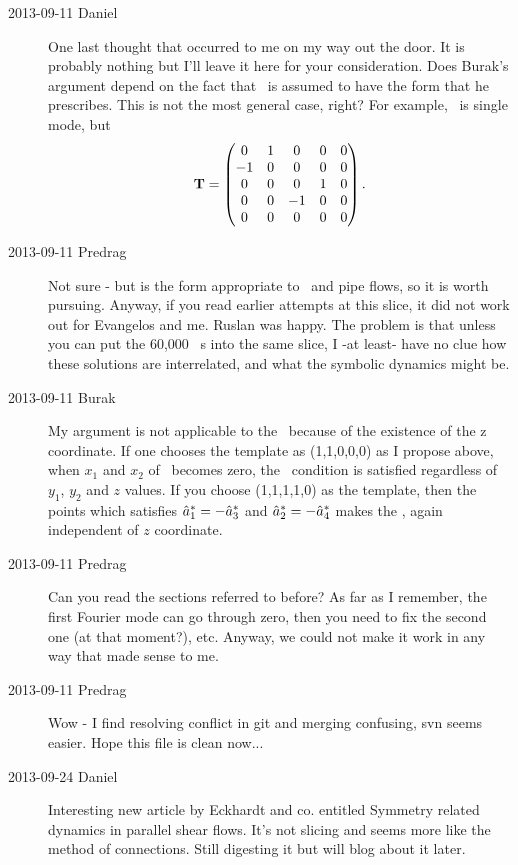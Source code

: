 \begin{description}
\item[2013-09-11 Daniel] One last thought that occurred to me on my
way out the door. It is probably nothing but I'll leave it here for
your consideration. Does Burak's argument depend on the fact that
\Lg\ is assumed to have the form that he prescribes. This is not the
most general case, right? For example, \cLf\ is single mode, but
\[
	\mathbf{T} =  \begin{pmatrix}
			 0  & 1 & 0 & 0 & 0\\
			 -1 & 0 & 0 & 0 & 0\\
			 0  & 0 & 0 & 1 & 0\\
			 0 & 0 & -1 & 0 & 0\\
			 0 & 0 & 0 & 0 & 0\\
			\end{pmatrix} .
\]

\item[2013-09-11 Predrag] Not sure - but  is
the form appropriate to \KS\ and pipe flows, so it is worth pursuing.
Anyway, if you read earlier attempts at this slice, it did not work
out for Evangelos and me. Ruslan was happy. The problem is that
unless you can put the 60,000 \KS\ \rpo s into the same slice, I -at
least- have no clue how these solutions are interrelated, and what
the symbolic dynamics might be.

\item[2013-09-11 Burak] My argument is not applicable to the \cLf\ because of the existence of the z coordinate. If one chooses the template as (1,1,0,0,0) as I propose above, when $x_1$ and $x_2$ of \cLf\ becomes zero, the \chartBord\ condition is satisfied regardless of $y_1$, $y_2$ and $z$ values. If you choose (1,1,1,1,0) as the template, then the points which satisfies $\hat{a}_1^* = -\hat{a}_3^*$ and $\hat{a}_2^* = -\hat{a}_4^*$  makes the \chartBord , again independent of $z$ coordinate.

\item[2013-09-11 Predrag] Can you read the sections referred to before?
As far as I remember, the first Fourier mode can go through zero, then you need
to fix the second one (at that moment?), etc. Anyway, we could not make it work
in any way that made sense to me.

\item[2013-09-11 Predrag] Wow - I find resolving conflict in git and merging confusing,
svn seems easier. Hope this file is clean now...

\item[2013-09-24 Daniel] Interesting new article by Eckhardt and co.
    entitled  {Symmetry related
    dynamics in parallel shear flows}. It's not slicing and
    seems more like the method of connections. Still digesting it but
    will blog about it later.


\end{description}
